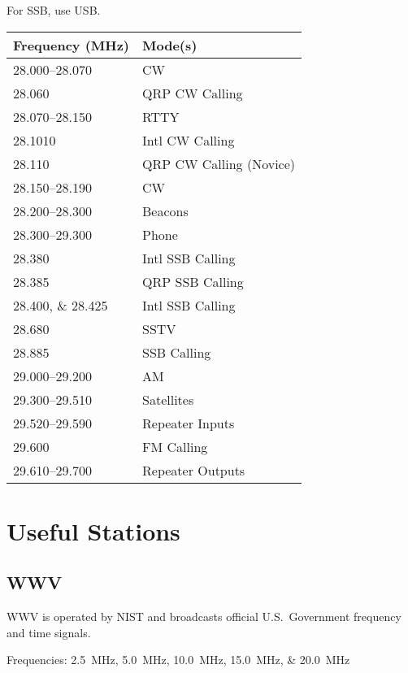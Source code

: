 \documentclass[11pt, onecolumn, table]{article}
\begin{document}
For SSB, use USB.
\begin{center}
  \begin{tabular}{l l}
    {Frequency (\si{\MHz})}			& Mode(s)					\\
    \midrule
    \numrange{28.000}{28.070}		& CW						\\
    \num{28.060}					& QRP CW Calling			\\
    \numrange{28.070}{28.150}		& RTTY						\\
    \num{28.1010}					& Intl CW Calling			\\
    \num{28.110}					& QRP CW Calling (Novice)	\\
    \numrange{28.150}{28.190}		& CW						\\
    \numrange{28.200}{28.300}		& Beacons					\\
    \numrange{28.300}{29.300}		& Phone						\\
    \num{28.380}					& Intl SSB Calling			\\
    \num{28.385}					& QRP SSB Calling			\\
    \numlist{28.400;28.425}			& Intl SSB Calling			\\
    \num{28.680}					& SSTV						\\
    \num{28.885}					& SSB Calling				\\
    \numrange{29.000}{29.200}		& AM						\\
    \numrange{29.300}{29.510}		& Satellites				\\
    \numrange{29.520}{29.590}		& Repeater Inputs			\\
    \num{29.600}					& FM Calling				\\
    \numrange{29.610}{29.700}		& Repeater Outputs			\\
  \end{tabular}
\end{center}

\clearpage

\clearpage


\section{Useful Stations}


\subsection{WWV}
WWV is operated by NIST and broadcasts official U.S.\ Government frequency and time signals.

Frequencies: \SIlist{2.5;5.0;10.0;15.0;20.0}{\MHz}
\end{document}
